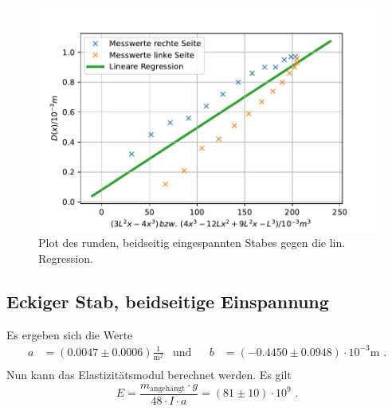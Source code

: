 \begin{figure}[H]
  \centering
  \includegraphics{pictures/Lineare Regression3.pdf}
  \caption{Plot des runden, beidseitig eingespannten Stabes gegen die lin. Regression.}
  \label{fig:plot3}
\end{figure}


\subsection{Eckiger Stab, beidseitige Einspannung}

Es ergeben sich die Werte 
\begin{align*}
  a &= (0.0047 ± 0.0006) \frac{1}{\unit{\meter\squared}} & \text{und}& & b&= (-0.4450 ± 0.0948) \cdot 10^{-3} \unit\meter \text{ .} \\
\end{align*}
Nun kann das Elastizitätsmodul berechnet werden. Es gilt
\begin{equation*}
  E = \frac{m_\text{angehängt} \cdot g}{48 \cdot I \cdot a} = (81\pm 10) \cdot 10^{9} \text{ .}
\end{equation*}





